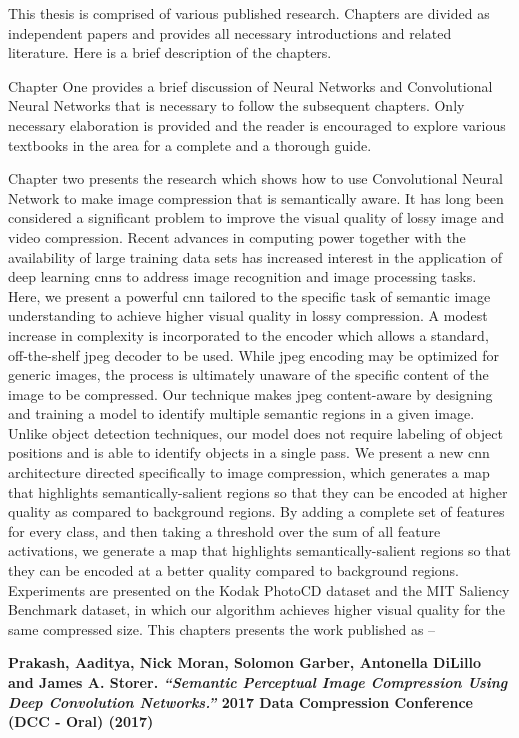 This thesis is comprised of various published research. Chapters are divided as independent papers and provides all necessary introductions and related literature. Here is a brief description of the chapters.

Chapter One provides a brief discussion of Neural Networks and Convolutional Neural Networks that is necessary to follow the subsequent chapters. Only necessary elaboration is provided and the reader is encouraged to explore various textbooks in the area for a complete and a thorough guide.

Chapter two presents the research which shows how to use Convolutional Neural Network to make image compression that is semantically aware.
It has long been considered a significant problem to improve the visual quality of lossy image and video compression. Recent advances in computing power together with the availability of large training data sets has increased interest in the application of deep learning cnns to address image recognition and image processing tasks. Here, we present a powerful cnn tailored to the specific task of semantic image understanding to achieve higher visual quality in lossy compression. A modest increase in complexity is incorporated to the encoder which allows a standard, off-the-shelf jpeg decoder to be used. While jpeg encoding may be optimized for generic images, the process is ultimately unaware of the specific content of the image to be compressed. Our technique makes jpeg content-aware by designing and training a model to identify multiple semantic regions in a given image. Unlike object detection techniques, our model does not require labeling of object positions and is able to identify objects in a single pass. We present a new cnn architecture directed specifically to image compression, which generates a map that highlights semantically-salient regions so that they can be encoded at higher quality as compared to background regions. By adding a complete set of features for every class, and then taking a threshold over the sum of all feature activations, we generate a map that highlights semantically-salient regions so that they can be encoded at a better quality compared to background regions. Experiments are presented on the Kodak PhotoCD dataset and the MIT Saliency Benchmark dataset, in which our algorithm achieves higher visual quality for the same compressed size.
This chapters presents the work published as --

\noindent\textbf{
Prakash, Aaditya, Nick Moran, Solomon Garber, Antonella DiLillo and James A. Storer. \textit{``Semantic Perceptual Image Compression Using Deep Convolution Networks.''} 2017 Data Compression Conference (DCC - Oral) (2017)
}
\vspace{2em}

